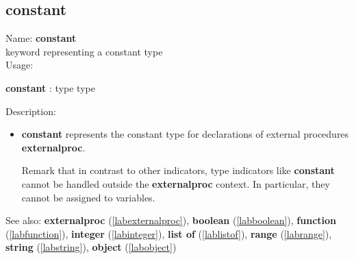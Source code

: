 \subsection{constant}
\label{labconstant}
\noindent Name: \textbf{constant}\\
\phantom{aaa}keyword representing a \textsf{constant} type \\[0.2cm]
\noindent Usage: 
\begin{center}
\textbf{constant} : \textsf{type type}\\
\end{center}
\noindent Description: \begin{itemize}

\item \textbf{constant} represents the \textsf{constant} type for declarations
   of external procedures \textbf{externalproc}.
    
   Remark that in contrast to other indicators, type indicators like
   \textbf{constant} cannot be handled outside the \textbf{externalproc} context.  In
   particular, they cannot be assigned to variables.
\end{itemize}
See also: \textbf{externalproc} (\ref{labexternalproc}), \textbf{boolean} (\ref{labboolean}), \textbf{function} (\ref{labfunction}), \textbf{integer} (\ref{labinteger}), \textbf{list of} (\ref{lablistof}), \textbf{range} (\ref{labrange}), \textbf{string} (\ref{labstring}), \textbf{object} (\ref{labobject})
